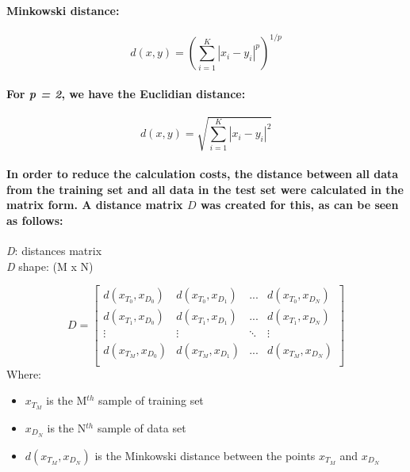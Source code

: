 \documentclass[a4paper]{article}    %
\begin{document}
\paragraph{Minkowski distance:}

\[ d(x,y) = \left( \sum_{i=1}^{K} |x_i - y_i|^p \right)^{1/p} \]

\paragraph{For \textit{p = 2}, we have the Euclidian distance:}

\[ d(x,y) = \sqrt{\sum_{i=1}^{K} |x_i - y_i|^2} \]

\paragraph{In order to reduce the calculation costs, the distance between all data from the training set and all data in the test set were calculated in the matrix form. A distance matrix $D$ was created for this, as can be seen as follows:}

\begin{center}
\textit{D}: distances matrix\\
\textit{D} shape: (M x N)
\end{center}

\begin{center}
    \begin{minipage}{.7\textwidth}
        \[ D = \begin{bmatrix}
          d(x_{T_0},x_{D_0}) & d(x_{T_0},x_{D_1}) &   ...  & d(x_{T_0},x_{D_N}) \\ 
          d(x_{T_1},x_{D_0}) & d(x_{T_1},x_{D_1}) &   ...  & d(x_{T_1},x_{D_N}) \\ 
                 \vdots      &       \vdots       & \ddots &        \vdots      \\
          d(x_{T_M},x_{D_0}) & d(x_{T_M},x_{D_1}) &   ...  & d(x_{T_M},x_{D_N}) \\ 
        \end{bmatrix} \]
        Where:
        \begin{itemize}
            \item $x_{T_M}$ is the M$^{th}$ sample of training set
            \item $x_{D_N}$ is the N$^{th}$ sample of data set
            \item $d(x_{T_M},x_{D_N})$ is the Minkowski distance between the points $x_{T_M}$ and $x_{D_N}$
        \end{itemize}
    \end{minipage}
\end{center}
\end{document}
